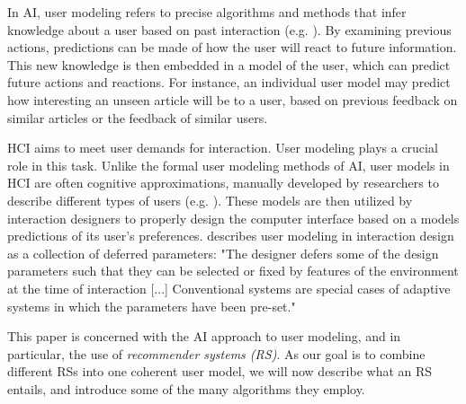 In AI, user modeling refers to precise algorithms and methods that infer knowledge about a user based on past interaction 
(e.g. \cite{Pazzani2007, Smyth2007, Alshamri2008, Resnick1994}).
By examining previous actions, predictions can be made of how the user will react to future information. This new knowledge is then embedded in a model of the user, which can predict future actions and reactions. 
For instance, an individual user model may predict how interesting an unseen article will be to a user, based on previous feedback on similar articles or the feedback of similar users.

HCI aims to meet user demands for interaction. 
User modeling plays a crucial role in this task. 
Unlike the formal user modeling methods of AI, user models in HCI are often cognitive approximations, manually developed by researchers to describe different types of users 
(e.g. \cite{Fischer2001, Jameson2009, Cato2001}).
These models are then utilized by interaction designers to properly design the computer interface based on a models predictions of its user’s preferences.
\cite{Totterdell1990} describes user modeling in interaction design as a collection of deferred parameters: "The designer defers some of the design parameters such that they can be selected or fixed by features of the environment at the time of interaction [...] Conventional systems are special cases of adaptive systems in which the parameters have been pre-set."

This paper is concerned with the AI approach to user modeling, and in particular, the use of \emph{recommender systems (RS)}.
As our goal is to combine different RSs into one coherent user model, we will now describe what an RS entails, and introduce some
of the many algorithms they employ.



